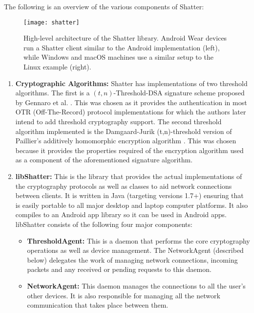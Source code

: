 The following is an overview of the various components of Shatter:

\begin{figure*}[!ht]
	\centering
	\texttt{[image: shatter]}
	\caption{
		High-level architecture of the Shatter library\cite{Atwater2016}. 
		Android Wear devices run a Shatter client similar to the Android 					
		implementation (left), while Windows and macOS machines use a similar
		setup to the Linux example (right).}
	\label{fig:shatter}
\end{figure*}

\begin{enumerate}[label=\arabic*., wide, labelwidth=!, labelindent=0pt]
	\item \textbf{Cryptographic Algorithms:} Shatter has implementations of two threshold algorithms. The first is a $(t,n)$-Threshold-DSA 						signature 	scheme proposed by Gennaro et al. \cite{Gennaro}. This was chosen as it provides the authentication in most OTR (Off-The-Record) 			protocol implementations for which the authors later intend to add threshold cryptography support. The second threshold algorithm 							implemented is the Damgaard-Jurik (t,n)-threshold version of Paillier's additively homomorphic encryption algorithm \cite{Damgard2000}. 					This was chosen because it 	provides the properties required of the encryption algorithm used as a component of the aforementioned signature 			algorithm.
	\item \textbf{libShatter:} This is the library that provides the actual implementations of the cryptography protocols as well as classes to aid 					network connections between clients. It is written in Java (targeting versions 1.7+) ensuring that is easily portable to all major desktop and 				laptop computer platforms. It also compiles to an Android app library so it can be used in Android apps. libShatter consists of the following four 			major components:
	\begin{itemize}
		\item \textbf{ThresholdAgent:} This is a daemon that performs the core cryptography operations as well as device management. The 							NetworkAgent (described below) delegates the work of managing network connections, incoming packets and any received or pending 						requests to this daemon.
		\item \textbf{NetworkAgent:} This daemon manages the connections to all the user's other devices. It is also responsible for managing all the 		network communication that takes place between them.

\end{itemize}
\end{enumerate}
